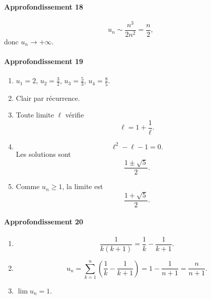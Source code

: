 \documentclass[11pt,a4paper]{article}
\theoremstyle{definition}
\begin{document}
\paragraph{Approfondissement 18}
\[
u_n\sim \frac{n^3}{2n^2}=\frac n2,
\]
donc $u_n\to+\infty$.

\paragraph{Approfondissement 19}
\begin{enumerate}[label=\arabic*.]
    \item $u_1=2$, $u_2=\frac32$, $u_3=\frac53$, $u_4=\frac85$.
    \item Clair par récurrence.
    \item Toute limite $\ell$ vérifie
    \[
    \ell=1+\frac1\ell.
    \]
    \item
    \[
    \ell^2-\ell-1=0.
    \]
    Les solutions sont
    \[
    \frac{1\pm\sqrt5}{2}.
    \]
    \item Comme $u_n\ge1$, la limite est
    \[
    \frac{1+\sqrt5}{2}.
    \]
\end{enumerate}

\paragraph{Approfondissement 20}
\begin{enumerate}[label=\arabic*.]
    \item
    \[
    \frac1{k(k+1)}=\frac1k-\frac1{k+1}.
    \]
    \item
    \[
    u_n=\sum_{k=1}^n\left(\frac1k-\frac1{k+1}\right)=1-\frac1{n+1}=\frac{n}{n+1}.
    \]
    \item $\lim u_n=1$.
\end{enumerate}
\end{document}
